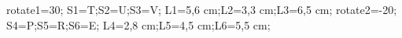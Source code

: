 \documentclass[exercice]{thedocument}%
\begin{document}
%
    \>rotate1=30;%
    \>S1=T;\>S2=U;\>S3=V;%
    \>L1=5,6 cm;\>L2=3,3 cm;\>L3=6,5 cm;%
    \>rotate2=-20;%
    \>S4=P;\>S5=R;\>S6=E;%
    \>L4=2,8 cm;\>L5=4,5 cm;\>L6=5,5 cm;%
\end{document}
